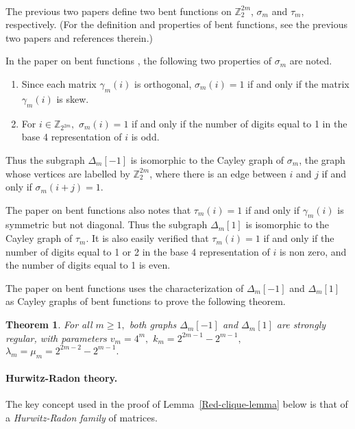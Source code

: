 \documentclass[12pt,a4paper]{article}
\newcommand{\mb}[1]{\mathbb{#1}}
\newcommand{\Z}{\mb{Z}}
\newtheorem{Theorem}{Theorem}
\begin{document}
~

The previous two papers \cite{Leo14Constructions,Leo15Bent} 
define two bent functions  on $\Z_2^{2 m}$, $\sigma_m$ and $\tau_m$, respectively.
(For the definition and properties of bent functions, see the previous two papers \cite{Leo14Constructions,Leo15Bent}
and references therein.)

In the paper on bent functions \cite{Leo15Bent}, the following two properties of $\sigma_m$ are noted.
\begin{enumerate}
 \item 
Since each matrix $\gamma_m(i)$ is orthogonal, $\sigma_m(i) = 1$ if and only if the matrix $\gamma_m(i)$ is skew.
 \item 
For $i \in \Z_{2^{2m}},$ $\sigma_m(i) = 1$ if and only if the number of
digits equal to 1 in  the base 4 representation of $i$ is odd.
\end{enumerate}
Thus the subgraph $\varDelta_m[-1]$ is isomorphic to the Cayley graph of $\sigma_m$,
the graph whose vertices are labelled by $\Z_2^{2 m}$,
where there is an edge between $i$ and $j$ if and only if $\sigma_m(i+j)=1$.

The paper on bent functions \cite{Leo15Bent} also notes that 
$\tau_m(i) = 1$ if and only if $\gamma_m(i)$ is symmetric but not diagonal.
Thus the subgraph $\varDelta_m[1]$ is isomorphic to the Cayley graph of $\tau_m$.
It is also easily verified that $\tau_m(i) = 1$ if and only if the number of digits equal to 1 or 2 in the base 4
representation of $i$ is non zero, and the number of digits equal to 1 is even.

The paper on bent functions \cite{Leo15Bent} uses the characterization of $\varDelta_m[-1]$ and $\varDelta_m[1]$ 
as Cayley graphs of bent functions to prove the following theorem. 
\begin{Theorem}\label{Twins-are-strongly-regular-theorem}
%
For all $m \geqslant 1,$
both graphs $\varDelta_m[-1]$ and $\varDelta_m[1]$ are strongly regular, with parameters
$v_m = 4^m,$ $k_m = 2^{2 m - 1} - 2^{m - 1},$ $\lambda_m=\mu_m=2^{2 m - 2} - 2^{m - 1}.$
%
\end{Theorem}

\paragraph*{Hurwitz-Radon theory.}
\label{sec-Hurwitz-Radon}
The key concept used in the proof of Lemma~\ref{Red-clique-lemma} below is that of a \emph{Hurwitz-Radon family} of matrices.
~
\end{document}

